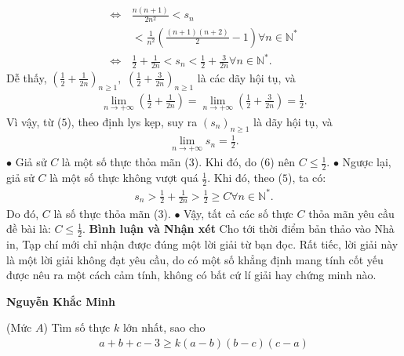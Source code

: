 \begin{multicols}{2}
\begin{align*}
		\Leftrightarrow\, &\frac{{n\left( {n + 1} \right)}}{{2{n^2}}} < {s_n}\\
		& < \frac{1}{{{n^2}}}\left( {\frac{{\left( {n + 1} \right)\left( {n + 2} \right)}}{2} - 1} \right)\forall n \in \mathbb{N^*}\\
		\Leftrightarrow \,&\frac{1}{2} + \frac{1}{{2n}} < {s_n} < \frac{1}{2} + \frac{3}{{2n}}\forall n \in \mathbb{N^*}. \tag{$5$}
	\end{align*}
	Dễ thấy, ${\left( {\frac{1}{2} + \frac{1}{{2n}}} \right)_{n \ge 1}},$ ${\left( {\frac{1}{2} + \frac{3}{{2n}}} \right)_{n \ge 1}}$ là các dãy hội tụ, và
	\begin{align*}
		\mathop {\lim }\limits_{n \to  + \infty } \left( {\frac{1}{2} + \frac{1}{{2n}}} \right) = \mathop {\lim }\limits_{n \to  + \infty } \left( {\frac{1}{2} + \frac{3}{{2n}}} \right) = \frac{1}{2}.
	\end{align*}
	Vì vậy, từ ($5$), theo định lys kẹp, suy ra ${\left( {{s_n}} \right)_{n \ge 1}}$  là dãy hội tụ, và
	\begin{align*}
		\mathop {\lim }\limits_{n \to  + \infty } {s_n} = \frac{1}{2}. \tag{$6$}
	\end{align*}
	$\bullet$ Giả sử $C$ là một số thực thỏa mãn ($3$).
	\vskip 0.05cm
	Khi đó, do ($6$) nên $C \le \frac{1}{2}$.
	\vskip 0.05cm  
	$\bullet$ Ngược lại, giả sử $C$ là một số thực không vượt quá  $\frac{1}{2}$.
	\vskip 0.05cm
	Khi đó, theo ($5$), ta có:
	\begin{align*}
		{s_n} > \frac{1}{2} + \frac{1}{{2n}} > \frac{1}{2} \ge C\forall n \in \mathbb{N^*}.
	\end{align*}
	Do đó, $C$ là số thực thỏa mãn ($3$).
	\vskip 0.05cm
	$\bullet$ Vậy, tất cả các số thực $C$ thỏa mãn yêu cầu đề bài là: $C \le \frac{1}{2}$.
	\vskip 0.05cm 
	\textbf{\color{thachthuctoanhoc}Bình luận và Nhận xét}
	\vskip 0.05cm
	Cho tới thời điểm bản thảo vào Nhà in, Tạp chí mới chỉ nhận được đúng một lời giải từ bạn đọc. Rất tiếc, lời giải này là một lời giải không đạt yêu cầu, do có một số khẳng định mang tính cốt yếu được nêu ra một cách cảm tính, không có bất cứ lí giải hay chứng minh nào.
	\begin{flushright}
		\textbf{\color{thachthuctoanhoc}Nguyễn Khắc Minh}
	\end{flushright}
	{}
	(Mức $A$) Tìm số thực $k$ lớn nhất, sao cho
	\begin{align*}
		a + b + c - 3 \ge k\left( {a - b} \right)\left( {b - c} \right)\left( {c - a} \right)
	\end{align*}

\end{multicols}
